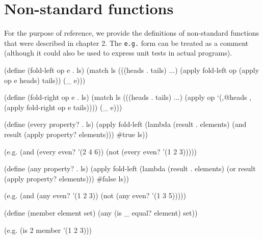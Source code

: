 \chapter{Non-standard functions} \label{non-standard-functions}

For the purpose of reference, we provide the definitions of non-standard
functions that were described in chapter 2. The \texttt{e.g.}\,\,form
can be treated as a comment (although it could also be used to express
unit tests in actual programs).

\begin{Snippet}
  (define (fold-left op e . ls)
    (match ls
      (((heads . tails) ...)
       (apply fold-left op (apply op e heads) tails))
      (_
       e)))
\end{Snippet}

\begin{Snippet}
  (define (fold-right op e . ls)
    (match ls
      (((heads . tails) ...)
       (apply op `(,@heads ,(apply fold-right op e tails))))
      (_
       e)))
\end{Snippet}

\begin{Snippet}
  (define (every property? . ls)
    (apply fold-left (lambda (result . elements)
                       (and result (apply property? elements)))
                     #true
                     ls))
\end{Snippet}

\begin{Snippet}
  (e.g. (and (every even? '(2 4 6))
             (not (every even? '(1 2 3)))))
\end{Snippet}


\begin{Snippet}
  (define (any property? . ls)
    (apply fold-left (lambda (result . elements)
                       (or result (apply property? elements)))
                     #false
                     ls))
\end{Snippet}

\begin{Snippet}
  (e.g. (and (any even? '(1 2 3))
             (not (any even? '(1 3 5)))))
\end{Snippet}

\begin{Snippet}
  (define (member element set)
    (any (is _ equal? element) set))
\end{Snippet}

\begin{Snippet}
  (e.g. (is 2 member '(1 2 3)))
\end{Snippet}

